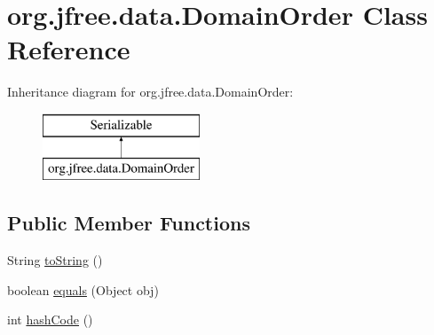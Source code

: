 \hypertarget{classorg_1_1jfree_1_1data_1_1_domain_order}{}\section{org.\+jfree.\+data.\+Domain\+Order Class Reference}
\label{classorg_1_1jfree_1_1data_1_1_domain_order}
Inheritance diagram for org.\+jfree.\+data.\+Domain\+Order\+:\begin{figure}[H]
\begin{center}
\leavevmode
\includegraphics[height=2.000000cm]{classorg_1_1jfree_1_1data_1_1_domain_order}
\end{center}
\end{figure}
\subsection*{Public Member Functions}
\begin{DoxyCompactItemize}
\item 
String \mbox{\hyperlink{classorg_1_1jfree_1_1data_1_1_domain_order_a5345f88cf5cfa9818f82364191644fd6}{to\+String}} ()
\item 
boolean \mbox{\hyperlink{classorg_1_1jfree_1_1data_1_1_domain_order_ad784e532580556a4a871e3133ba8873f}{equals}} (Object obj)
\item 
int \mbox{\hyperlink{classorg_1_1jfree_1_1data_1_1_domain_order_a14b1aaac4aa452f428b07a5bd6aed3c0}{hash\+Code}} ()
\end{DoxyCompactItemize}
